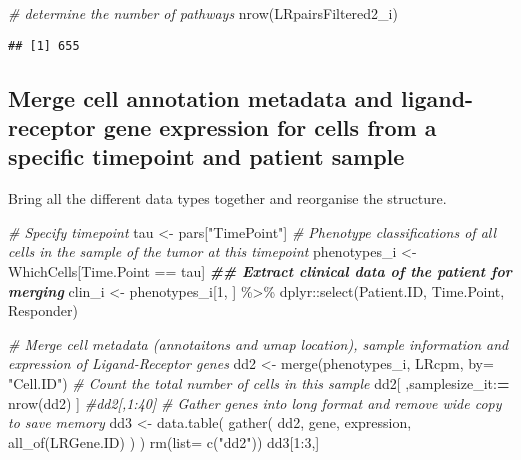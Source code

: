 \documentclass[
]{article}
\newenvironment{Shaded}{\begin{snugshade}}{\end{snugshade}}
\newcommand{\AttributeTok}[1]{\textcolor[rgb]{0.77,0.63,0.00}{#1}}
\newcommand{\CommentTok}[1]{\textcolor[rgb]{0.56,0.35,0.01}{\textit{#1}}}
\newcommand{\DecValTok}[1]{\textcolor[rgb]{0.00,0.00,0.81}{#1}}
\newcommand{\DocumentationTok}[1]{\textcolor[rgb]{0.56,0.35,0.01}{\textbf{\textit{#1}}}}
\newcommand{\ErrorTok}[1]{\textcolor[rgb]{0.64,0.00,0.00}{\textbf{#1}}}
\newcommand{\FunctionTok}[1]{\textcolor[rgb]{0.00,0.00,0.00}{#1}}
\newcommand{\NormalTok}[1]{#1}
\newcommand{\OtherTok}[1]{\textcolor[rgb]{0.56,0.35,0.01}{#1}}
\newcommand{\SpecialCharTok}[1]{\textcolor[rgb]{0.00,0.00,0.00}{#1}}
\newcommand{\StringTok}[1]{\textcolor[rgb]{0.31,0.60,0.02}{#1}}
\begin{document}
\begin{Shaded}
\begin{Highlighting}[]
\CommentTok{\# determine the number of pathways}
\FunctionTok{nrow}\NormalTok{(LRpairsFiltered2\_i)}
\end{Highlighting}
\end{Shaded}

\begin{verbatim}
## [1] 655
\end{verbatim}

\hypertarget{merge-cell-annotation-metadata-and-ligand-receptor-gene-expression-for-cells-from-a-specific-timepoint-and-patient-sample}{%
\subsection{Merge cell annotation metadata and ligand-receptor gene
expression for cells from a specific timepoint and patient
sample}\label{merge-cell-annotation-metadata-and-ligand-receptor-gene-expression-for-cells-from-a-specific-timepoint-and-patient-sample}}

Bring all the different data types together and reorganise the
structure.

\begin{Shaded}
\begin{Highlighting}[]
\CommentTok{\# Specify timepoint}
\NormalTok{tau }\OtherTok{\textless{}{-}}\NormalTok{ pars[}\StringTok{"TimePoint"}\NormalTok{]}
\CommentTok{\# Phenotype classifications of all cells in the sample of the tumor at this timepoint}
\NormalTok{phenotypes\_i }\OtherTok{\textless{}{-}}\NormalTok{ WhichCells[Time.Point }\SpecialCharTok{==}\NormalTok{ tau]}
\DocumentationTok{\#\# Extract clinical data of the patient for merging}
\NormalTok{clin\_i }\OtherTok{\textless{}{-}}\NormalTok{ phenotypes\_i[}\DecValTok{1}\NormalTok{, ] }\SpecialCharTok{\%\textgreater{}\%}\NormalTok{ dplyr}\SpecialCharTok{::}\FunctionTok{select}\NormalTok{(Patient.ID, Time.Point, Responder)}

\CommentTok{\# Merge cell metadata (annotaitons and umap location), sample information and expression of Ligand{-}Receptor genes}
\NormalTok{dd2 }\OtherTok{\textless{}{-}}  \FunctionTok{merge}\NormalTok{(phenotypes\_i, LRcpm, }\AttributeTok{by=} \StringTok{"Cell.ID"}\NormalTok{)}
\CommentTok{\# Count the total number of cells in this sample}
\NormalTok{dd2[ ,samplesize\_it}\SpecialCharTok{:}\ErrorTok{=} \FunctionTok{nrow}\NormalTok{(dd2) ]   }\CommentTok{\#dd2[,1:40]}
\CommentTok{\# Gather genes into long format and remove wide copy to save memory}
\NormalTok{dd3 }\OtherTok{\textless{}{-}} \FunctionTok{data.table}\NormalTok{( }\FunctionTok{gather}\NormalTok{( dd2, gene, expression, }\FunctionTok{all\_of}\NormalTok{(LRGene.ID) ) )}
\FunctionTok{rm}\NormalTok{(}\AttributeTok{list=} \FunctionTok{c}\NormalTok{(}\StringTok{"dd2"}\NormalTok{))}
\NormalTok{dd3[}\DecValTok{1}\SpecialCharTok{:}\DecValTok{3}\NormalTok{,]}
\end{Highlighting}
\end{Shaded}
\end{document}
